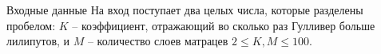 Входные данные
На вход поступает два целых числа, которые разделены пробелом: $K$ -- коэффициент, отражающий во сколько раз Гулливер больше лилипутов, и $M$ -- количество слоев матрацев $2 \le K, M \le 100$.